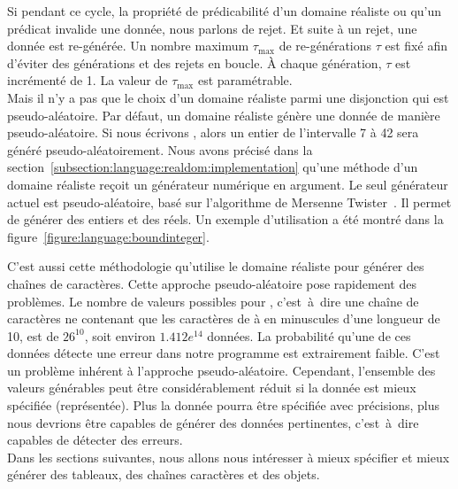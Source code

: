 Si pendant ce cycle, la propriété de prédicabilité d'un domaine réaliste ou
qu'un prédicat invalide une donnée, nous parlons de {\strong rejet}. Et suite à
un rejet, une donnée est re-générée. Un nombre maximum $\tau_\mathrm{max}$ de
re-générations $\tau$ est fixé afin d'éviter des générations et des rejets en
boucle. À chaque génération, $\tau$ est incrémenté de 1. La valeur de
$\tau_\mathrm{max}$ est paramétrable. \\

Mais il n'y a pas que le choix d'un domaine réaliste parmi une disjonction qui
est pseudo-aléatoire. Par défaut, un domaine réaliste génère une donnée de
manière pseudo-aléatoire.  Si nous écrivons , alors un
entier de l'intervalle 7 à 42 sera généré pseudo-aléatoirement. Nous avons
précisé dans la section~\ref{subsection:language:realdom:implementation} qu'une
méthode  d'un domaine réaliste reçoit un générateur numérique en
argument. Le seul générateur actuel est pseudo-aléatoire, basé sur l'algorithme
de Mersenne Twister~. Il permet de générer des entiers et
des réels. Un exemple d'utilisation a été montré dans la
figure~\ref{figure:language:boundinteger}.

C'est aussi cette méthodologie qu'utilise le domaine réaliste  pour
générer des chaînes de caractères. Cette approche pseudo-aléatoire pose
rapidement des problèmes. Le nombre de valeurs possibles pour , c'est~à~dire une chaîne de caractères ne contenant que les caractères
de  à  en minuscules d'une longueur de 10, est de $26^{10}$,
soit environ $1.412e^{14}$ données. La probabilité qu'une de ces données détecte
une erreur dans notre programme est extrairement faible. C'est un problème
inhérent à l'approche pseudo-aléatoire. Cependant, l'ensemble des valeurs
générables peut être considérablement réduit si la donnée est mieux spécifiée
(représentée). Plus la donnée pourra être spécifiée avec précisions, plus nous
devrions être capables de générer des données pertinentes, c'est~à~dire capables
de détecter des erreurs. \\

Dans les sections suivantes, nous allons nous intéresser à mieux spécifier et
mieux générer des tableaux, des chaînes caractères et des objets.
